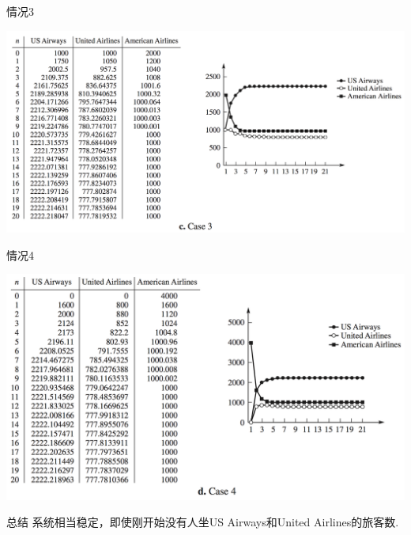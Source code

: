 \documentclass[UTF8, mathserif]{ctexbeamer}
\begin{document}
\begin{frame}{情况3}
  \begin{center}
    \includegraphics[width=.9\textwidth{}]{party-3.png}
  \end{center}  
\end{frame}

\begin{frame}{情况4}
  \begin{center}
    \includegraphics[width=.9\textwidth{}]{party-4.png}
  \end{center}  
\end{frame}

\begin{frame}{总结}
系统相当稳定，即使刚开始没有人坐US Airways和United Airlines的旅客数.
  
\end{frame}
\end{document}
